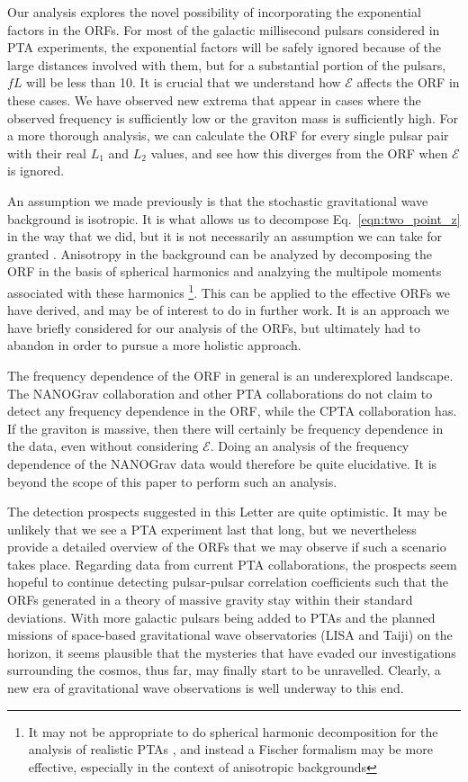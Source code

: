 \documentclass[prd,twocolumn,aps,psfig,nofootinbib,nobibnotes,superscriptaddress,preprintnumbers,times]{revtex4-2}
\begin{document}
Our analysis explores the novel possibility of incorporating the exponential factors in the ORFs. For most of the galactic millisecond pulsars considered in PTA experiments, the exponential factors will be safely ignored because of the large distances involved with them, but for a substantial portion of the pulsars, $fL$ will be less than 10. It is crucial that we understand how $\mathcal{E}$ affects the ORF in these cases. We have observed new extrema that appear in cases where the observed frequency is sufficiently low or the graviton mass is sufficiently high.  For a more thorough analysis, we can calculate the ORF for every single pulsar pair with their real $L_1$ and $L_2$ values, and see how this diverges from the ORF when $\mathcal{E}$ is ignored.

An assumption we made previously is that the stochastic gravitational wave background is isotropic. It is what allows us to decompose Eq.\ \ref{eqn:two_point_z} in the way that we did, but it is not necessarily an assumption we can take for granted \cite{Depta:2024ykq, Bravo:2025csu, Cusin:2025xle, Kuwahara:2024jiz, Li:2024lvt}. Anisotropy in the background can be analyzed by decomposing the ORF in the basis of spherical harmonics and analzying the multipole moments associated with these harmonics \cite{Allen:2024bnk, Gair:2014rwa}\footnote{It may not be appropriate to do spherical harmonic decomposition for the analysis of realistic PTAs \cite{Ali-Haimoud:2020ozu}, and instead a Fischer formalism may be more effective, especially in the context of anisotropic backgrounds}. This can be applied to the effective ORFs we have derived, and may be of interest to do in further work. It is an approach we have briefly considered for our analysis of the ORFs, but ultimately had to abandon in order to pursue a more holistic approach.

The frequency dependence of the ORF in general is an underexplored landscape. The NANOGrav collaboration and other PTA collaborations do not claim to detect any frequency dependence in the ORF, while the CPTA collaboration has. If the graviton is massive, then there will certainly be frequency dependence in the data, even without considering $\mathcal{E}$. Doing an analysis of the frequency dependence of the NANOGrav data would therefore be quite elucidative. It is beyond the scope of this paper to perform such an analysis.

The detection prospects suggested in this Letter are quite optimistic. It may be unlikely that we see a PTA experiment last that long, but we nevertheless provide a detailed overview of the ORFs that we may observe if such a scenario takes place. Regarding data from current PTA collaborations, the prospects seem hopeful to continue detecting pulsar-pulsar correlation coefficients such that the ORFs generated in a theory of massive gravity stay within their standard deviations. With more galactic pulsars being added to PTAs and the planned missions of space-based gravitational wave observatories (LISA and Taiji) on the horizon, it seems plausible that the mysteries that have evaded our investigations surrounding the cosmos, thus far, may finally start to be unravelled. Clearly, a new era of gravitational wave observations is well underway to this end. 
\end{document}

